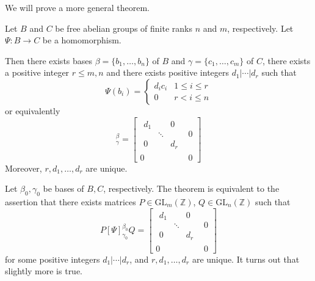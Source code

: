 \documentclass{article}
\begin{document}
We will prove a more general theorem.
\begin{idea}
    Let $B$ and $C$ be free abelian groups of finite ranks $n$ and $m$, respectively. Let $\Psi: B\rightarrow C$ be a homomorphism.
    \vspace{2mm}

    Then there exists bases $\beta=\{b_1,\dots,b_n\}$ of $B$ and $\gamma=\{c_1,\dots,c_m\}$ of $C$, there exists a positive integer $r \le m,n$ and there exists positive integers $d_1|\cdots | d_r$ such that
    \begin{equation*}
        \Psi(b_i) = \begin{cases}
            d_ic_i & 1\le i \le r \\
            0      & r < i \le n
        \end{cases}
    \end{equation*}
    or equivalently
    \begin{equation*}
        [\Psi]^\beta_\gamma =
        \left[
            \begin{array}{c|c}
                \begin{array}{ccc}
                    d_1 &        & 0   \\
                        & \ddots &     \\
                    0   &        & d_r
                \end{array} & 0 \\
                \hline
                0                          & 0
            \end{array}
            \right]
    \end{equation*}
    Moreover, $r,d_1,\dots,d_r$ are unique.
\end{idea}
Let $\beta_0,\gamma_0$ be bases of $B,C$, respectively. The theorem is equivalent to the assertion that there exists matrices $P\in \text{GL}_m(\mathbb{Z})$, $Q\in \text{GL}_n(\mathbb{Z})$ such that
\begin{equation*}
    P[\Psi]_{\gamma_0}^{\beta_0}Q =     \left[
        \begin{array}{c|c}
            \begin{array}{ccc}
                d_1 &        & 0   \\
                    & \ddots &     \\
                0   &        & d_r
            \end{array} & 0 \\
            \hline
            0                          & 0
        \end{array}
        \right]
\end{equation*}
for some positive integers $d_1|\cdots |d_r$, and $r,d_1,\dots,d_r$ are unique. It turns out that slightly more is true.
\end{document}
